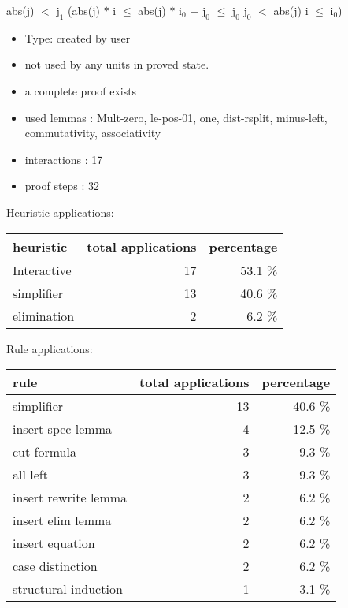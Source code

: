 \documentclass[a4paper]{article}
\begin{document}
\medskip

 \Fol abs(j) $<$ $\mbox{j}_{1}$ \Imp (abs(j) $*$ i $\le$ abs(j) $*$ $\mbox{i}_{0}$ + $\mbox{j}_{0}$  $\le$ $\mbox{j}_{0}$ \And $\mbox{j}_{0}$ $<$ abs(j) \Imp i $\le$ $\mbox{i}_{0}$)

\begin{itemize}

\item Type: created by user

\item not used by any units in proved state.
\item       a complete proof exists
\item       used lemmas  : Mult-zero, le-pos-01, one, dist-rsplit, minus-left, commutativity, associativity
\item       interactions : 17
\item       proof steps  : 32
\end{itemize}

\medskip


Heuristic applications:

\begin{supertabular}{l|r|r}
heuristic	& total applications & percentage \\ \hline
Interactive & 17 & 53.1 \% \\
simplifier & 13 & 40.6 \% \\
elimination & 2 & 6.2 \% \\

\end{supertabular}

Rule applications:

\begin{supertabular}{l|r|r}
rule	        & total applications & percentage \\ \hline
simplifier & 13 & 40.6 \% \\
insert spec-lemma & 4 & 12.5 \% \\
cut formula & 3 & 9.3 \% \\
all left & 3 & 9.3 \% \\
insert rewrite lemma & 2 & 6.2 \% \\
insert elim lemma & 2 & 6.2 \% \\
insert equation & 2 & 6.2 \% \\
case distinction & 2 & 6.2 \% \\
structural induction & 1 & 3.1 \% \\

\end{supertabular}
\end{document}
